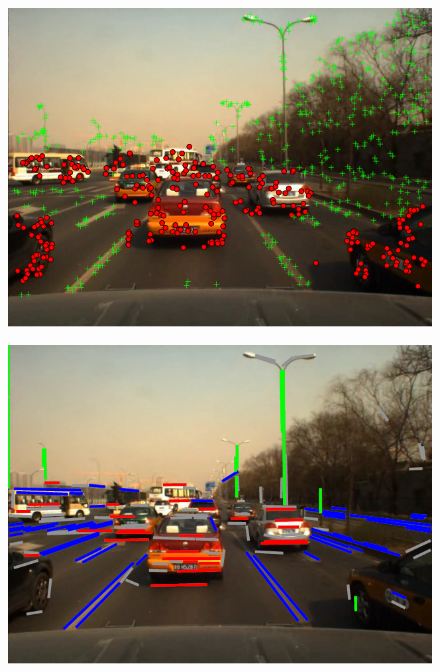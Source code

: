 \documentclass[letterpaper, 10 pt, conference]{ieeeconf}  %
\begin{document}
\begin{figure}
\centering
 \begin{minipage}[t]{0.48\linewidth}
    \centering
    \includegraphics[width=1\textwidth]{source//Final//image0130_277in785.png}
    \label{fig:line_feature}
  \end{minipage}%
  \hfill
 \begin{minipage}[t]{0.48\linewidth}
    \centering
    \includegraphics[width=1\textwidth]{source//Final//image0130_84in144.png}
    \label{fig:point_feature}
  \end{minipage}%
 \vfill
 \begin{minipage}[t]{0.48\linewidth}
    \centering

\end{minipage}
\end{figure}
\end{document}
